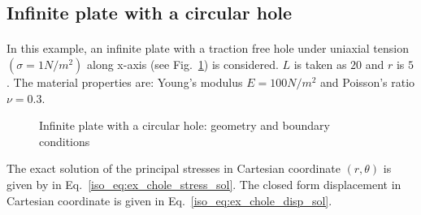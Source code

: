 \subsection{Infinite plate with a circular hole}
\paragraph{}
In this example, an infinite plate with a traction free hole under uniaxial tension $(\sigma = 1 N/m^2 )$ along x-axis (see Fig.~\ref{qdt_fig:ex_chole_geo_bc}) is considered.
$L$ is taken as $20$ and $r$ is $5$.
The material properties are: Young’s modulus $E = 100 N/m^2$ and Poisson’s ratio $\nu = 0.3$.
    \begin{figure}[H]
        \centering
        \caption{ Infinite plate with a circular hole: geometry and boundary conditions}
        \label{qdt_fig:ex_chole_geo_bc}
    \end{figure}
%
The exact solution of the principal stresses in Cartesian coordinate $(r,\theta)$ is given by \citep{Sukumar2001} in Eq.~\ref{iso_eq:ex_chole_stress_sol}.
The closed form displacement in Cartesian coordinate is given in Eq.~\ref{iso_eq:ex_chole_disp_sol}.
